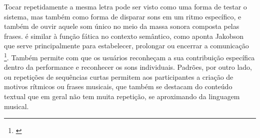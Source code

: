 
Tocar repetidamente a mesma letra pode ser visto como uma forma de testar o sistema, mas também como forma de disparar sons em um ritmo específico, e também de ouvir aquele som único no meio da massa sonora composta pelas frases. é similar à função fática no contexto semântico, como aponta Jakobson que serve principalmente para estabelecer, prolongar ou encerrar a comunicação \footnote{\cite{Jakobson}}. Também permite com que os usuários reconheçam a sua contribuição específica dentro da performance e reconhecer os sons individuais. Padrões, por outro lado, ou repetições de sequências curtas permitem aos participantes a criação de motivos rítmicos ou frases musicais, que também se destacam do conteúdo textual que em geral não tem muita repetição, se aproximando da linguagem musical.


